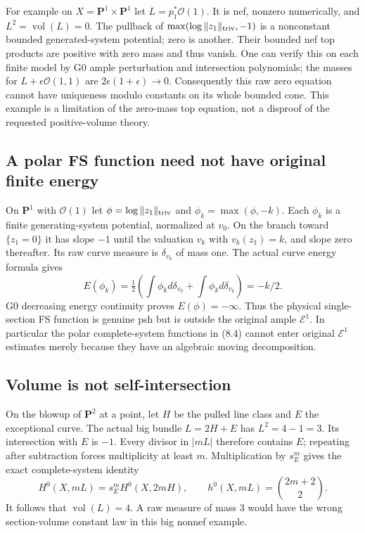 \documentclass[10pt]{article}
\newcommand{\vol}{\operatorname{vol}}
\newcommand{\OO}{\mathcal O}
\newcommand{\E}{\mathcal E}
\begin{document}
For example on $X=\mathbf P^1\times\mathbf P^1$ let
$L=p_1^*\OO(1)$. It is nef, nonzero numerically, and $L^2=\vol(L)=0$.
The pullback of $\max(\log\|z_1\|_{\rm triv},-1)$ is a nonconstant bounded
generated-system potential; zero is another. Their bounded nef top
products are positive with zero mass and thus vanish. One can verify
this on each finite model by G0 ample perturbation and intersection
polynomials; the masses for $L+\epsilon\OO(1,1)$ are
$2\epsilon(1+\epsilon)\to0$. Consequently this raw zero equation cannot
have uniqueness modulo constants on its whole bounded cone. This example
is a limitation of the zero-mass top equation, not a disproof of the
requested positive-volume theory.

\subsection{A polar FS function need not have original finite energy}
On $\mathbf P^1$ with $\OO(1)$ let
$\phi=\log\|z_1\|_{\rm triv}$ and
$\phi_k=\max(\phi,-k)$. Each $\phi_k$ is a finite generating-system
potential, normalized at $v_0$. On the branch toward $\{z_1=0\}$ it
has slope $-1$ until the valuation $v_k$ with $v_k(z_1)=k$, and slope
zero thereafter. Its raw curve measure is $\delta_{v_k}$ of mass one.
The actual curve energy formula gives
\[
 E(\phi_k)=\tfrac12\left(\int\phi_kd\delta_{v_0}
                        +\int\phi_kd\delta_{v_k}\right)=-k/2.
\]
G0 decreasing energy continuity proves $E(\phi)=-\infty$. Thus the
physical single-section FS function is genuine psh but is outside the
original ample $\E^1$. In particular the polar complete-system functions
in (8.4) cannot enter original $\E^1$ estimates merely because they have
an algebraic moving decomposition.

\subsection{Volume is not self-intersection}
On the blowup of $\mathbf P^2$ at a point, let $H$ be the pulled line
class and $E$ the exceptional curve. The actual big bundle $L=2H+E$
has $L^2=4-1=3$. Its intersection with $E$ is $-1$. Every divisor in
$|mL|$ therefore contains $E$; repeating after subtraction forces
multiplicity at least $m$. Multiplication by $s_E^m$ gives the exact
complete-system identity
\[
 H^0(X,mL)=s_E^mH^0(X,2mH),\qquad
 h^0(X,mL)={2m+2\choose2}.
\]
It follows that $\vol(L)=4$. A raw measure of mass $3$ would have the
wrong section-volume constant law in this big nonnef example.
\end{document}
